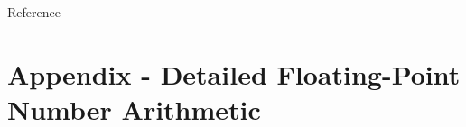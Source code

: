 \begin{frame}[allowframebreaks]{Reference}


\printbibliography[title=Reference]

\end{frame}

\appendix
\backupbegin

\section{Appendix - Detailed Floating-Point Number Arithmetic}
\label{sec:appendix-fpu}


%
%
%
%
%
%
%

\backupend

